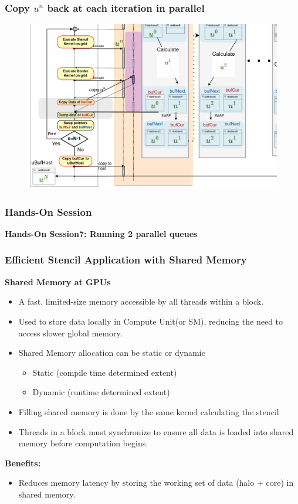\documentclass[9pt]{beamer}
\begin{document}
\begin{frame}
\frametitle{Copy $u^{n}$ back at each iteration in parallel}
\begin{figure}
    \centering
    \includegraphics[width=0.8\linewidth]{Screenshot from 2024-09-26 15-05-25.png}
    \label{fig:enter-label}
\end{figure}
\end{frame}


\begin{frame}
\frametitle{Hands-On Session}
\begin{center}
      \Huge \textbf{Hands-On Session7: Running 2 parallel queues}
  \end{center}
\end{frame}


\begin{frame}[fragile]
\frametitle{Efficient Stencil Application with Shared Memory}
\textbf{Shared Memory at GPUs}
    \begin{itemize}
        \item A fast, limited-size memory accessible by all threads within a block.
        \item Used to store data locally in Compute Unit(or SM), reducing the need to access slower global memory.
        \item Shared Memory allocation can be static or dynamic
        \begin{itemize}
            \item Static (compile time determined extent)
            \item Dynamic (runtime determined extent)
        \end{itemize}
         \item Filling shared memory is done by the same kernel calculating the stencil
         \item Threads in a block must synchronize to ensure all data is loaded into shared memory before computation begins.
   \end{itemize}
  \textbf{Benefits:}
    \begin{itemize}
        \item Reduces memory latency by storing the working set of data (halo + core) in shared memory.
    \end{itemize}
\end{frame}
\end{document}

